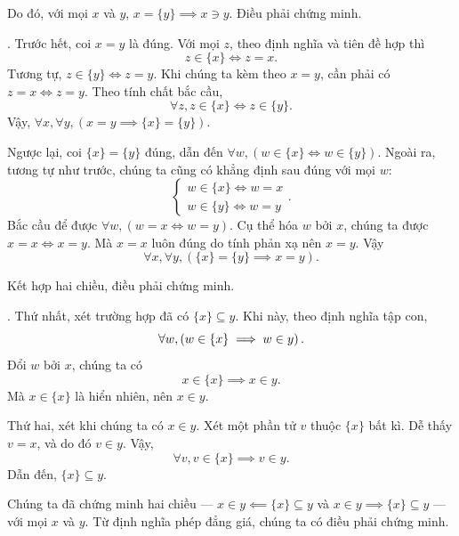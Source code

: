 Do đó, với mọi $x$ và $y$, $x = \{y\} \implies x \ni y$. Điều phải chứng minh.

. Trước hết, coi $x = y$ là đúng. Với mọi $z$, theo định nghĩa và tiên đề hợp thì
\begin{equation*}
   z \in \{x\} \iff z = x.
\end{equation*}
Tương tự, $z \in \{y\} \iff z = y$. Khi chúng ta kèm theo $x = y$, cần phải có $z = x \iff z = y$. Theo tính chất bắc cầu,
\begin{equation*}
   \forall z, z \in \{x\} \iff z \in \{y\}.
\end{equation*}
Vậy, $\forall x, \forall y, \left(x = y \implies \{x\} = \{y\}\right)$.

Ngược lại, coi $\{x\} = \{y\}$ đúng, dẫn đến $\forall w, \left(w \in \{x\} \iff w \in \{y\}\right)$. Ngoài ra, tương tự như trước, chúng ta cũng có khẳng định sau đúng với mọi $w$:
\begin{equation*}
   \begin{cases}
      w \in \{x\} \iff w = x \\
      w \in \{y\} \iff w = y
   \end{cases}.
\end{equation*}
Bắc cầu để được $\forall w, (w = x \iff w = y)$. Cụ thể hóa $w$ bởi $x$, chúng ta được $x = x \iff x = y$. Mà $x = x$ luôn đúng do tính phản xạ nên $x = y$. Vậy
\begin{equation*}
   \forall x, \forall y, \left(\{x\} = \{y\} \implies x = y\right).
\end{equation*}

Kết hợp hai chiều, điều phải chứng minh.

. Thứ nhất, xét trường hợp đã có $\{x\} \subseteq y$. Khi này, theo định nghĩa tập con,
\begin{equation*}
   \forall w, \left(w \in \{x\} \implies w \in y\right).\\
\end{equation*}
Đổi $w$ bởi $x$, chúng ta có
\begin{equation*}
   x \in \{x\} \implies x \in y.
\end{equation*}
Mà $x \in \{x\}$ là hiển nhiên, nên $x \in y$.

Thứ hai, xét khi chúng ta có $x \in y$. Xét một phần tử $v$ thuộc $\{x\}$ bất kì. Dễ thấy $v = x$, và do đó $v \in y$. Vậy,
\begin{equation*}
   \forall v, v \in \{x\} \implies v \in y.
\end{equation*}
Dẫn đến, $\{x\} \subseteq y$.

Chúng ta đã chứng minh hai chiều --- $x \in y \impliedby \{x\} \subseteq y$ và $x \in y \implies \{x\} \subseteq y$ --- với mọi $x$ và $y$. Từ định nghĩa phép đẳng giá, chúng ta có điều phải chứng minh.